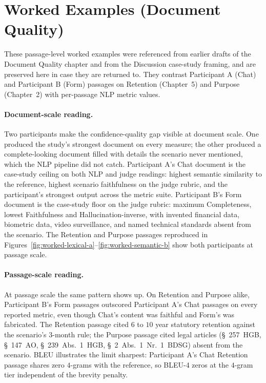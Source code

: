 \section{Worked Examples (Document Quality)}
\label{app:worked-examples}

These passage-level worked examples were referenced from earlier
drafts of the Document Quality chapter and from the Discussion
case-study framing, and are preserved here in case they are
returned to. They contrast Participant A (Chat) and Participant
B (Form) passages on Retention (Chapter~5) and Purpose
(Chapter~2) with per-passage NLP metric values.

\paragraph{Document-scale reading.} Two participants make the
confidence-quality gap visible at document scale. One produced
the study's strongest document on every measure; the other
produced a complete-looking document filled with details the
scenario never mentioned, which the NLP pipeline did not catch.
Participant A's Chat document is the case-study ceiling on both
NLP and judge readings: highest semantic similarity to the
reference, highest scenario faithfulness on the judge rubric,
and the participant's strongest output across the metric suite.
Participant B's Form document is the case-study floor on the
judge rubric: maximum Completeness, lowest Faithfulness and
Hallucination-inverse, with invented financial data, biometric
data, video surveillance, and named technical standards absent
from the scenario. The Retention and Purpose passages reproduced
in Figures~\ref{fig:worked-lexical-a}--\ref{fig:worked-semantic-b}
show both participants at passage scale.

\paragraph{Passage-scale reading.} At passage scale the same
pattern shows up. On Retention and Purpose alike, Participant B's
Form passages outscored Participant A's Chat passages on every
reported metric, even though Chat's content was faithful and
Form's was fabricated. The Retention passage cited $6$ to $10$
year statutory retention against the scenario's $3$-month rule;
the Purpose passage cited legal articles (\S~257~HGB,
\S~147~AO, \S~239~Abs.~1~HGB, \S~2~Abs.~1~Nr.~1~BDSG) absent
from the scenario. BLEU illustrates the limit sharpest:
Participant A's Chat Retention passage shares zero $4$-grams
with the reference, so BLEU-4 zeros at the $4$-gram tier
independent of the brevity penalty.

